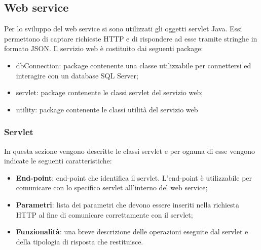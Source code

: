\documentclass[12pt, a4paper, titlepage]{report}
\begin{document}
	\subsection{Web service}
	
	Per lo sviluppo del web service si sono utilizzati gli oggetti servlet Java. Essi permettono di captare richieste HTTP e di rispondere ad esse tramite stringhe in formato JSON. Il servizio web è costituito dai seguenti package:
	\begin{itemize}
		\item dbConnection: package contenente una classe utilizzabile per connettersi ed interagire con un database SQL Server;
		\item servlet: package contenente le classi servlet del servizio web;
		\item utility: package contenente le classi utilità del servizio web
	\end{itemize}

	\subsubsection{Servlet}
	
	In questa sezione vengono descritte le classi servlet e per ognuna di esse vengono indicate le seguenti caratteristiche:
	\begin{itemize}
		\item \textbf{End-point}: end-point che identifica il servlet. L'end-point è utilizzabile per comunicare con lo specifico servlet all'interno del web service;
		\item \textbf{Parametri}: lista dei parametri che devono essere inseriti nella richiesta HTTP al fine di comunicare correttamente con il servlet;
		\item \textbf{Funzionalità}: una breve descrizione delle operazioni eseguite dal servlet e della tipologia di risposta che restituisce.
	\end{itemize}
\end{document}
